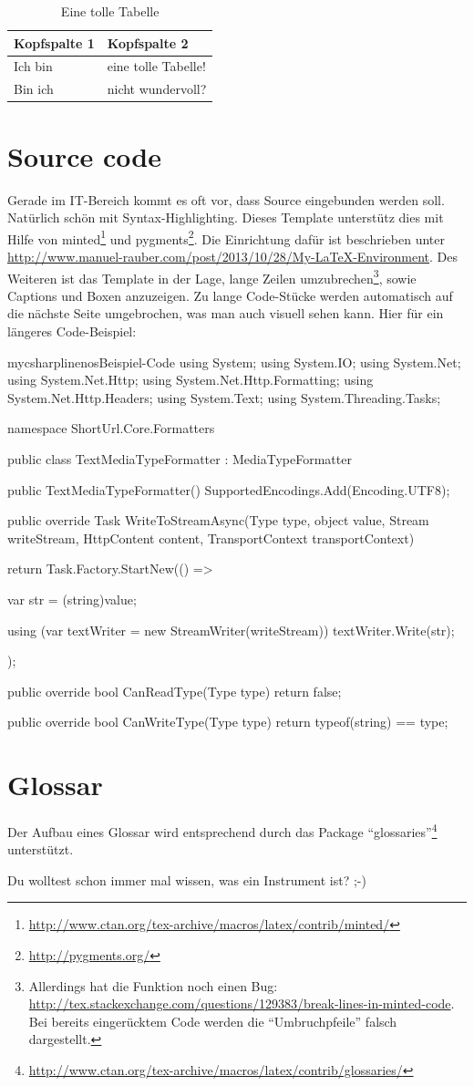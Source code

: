 \begin{table}[H]
\centering
\begin{tabular}{ll}
	\textbf{Kopfspalte 1} & \textbf{Kopfspalte 2} \\ \hline\hline
	Ich bin               & eine tolle Tabelle!   \\ \hline
	Bin ich               & nicht wundervoll?
\end{tabular}
\caption{Eine tolle Tabelle}
\end{table}

\section{Source code}

Gerade im IT-Bereich kommt es oft vor, dass Source eingebunden werden soll. Natürlich schön mit Syntax-Highlighting. 
Dieses Template unterstütz dies mit Hilfe von minted\footnote{\url{http://www.ctan.org/tex-archive/macros/latex/contrib/minted/}} und pygments\footnote{\url{http://pygments.org/}}. Die Einrichtung dafür ist beschrieben unter \url{http://www.manuel-rauber.com/post/2013/10/28/My-LaTeX-Environment}.
Des Weiteren ist das Template in der Lage, lange Zeilen umzubrechen\footnote{Allerdings hat die Funktion noch einen Bug: \url{http://tex.stackexchange.com/questions/129383/break-lines-in-minted-code}. Bei bereits eingerücktem Code werden die \enquote{Umbruchpfeile} falsch dargestellt.}, sowie Captions und Boxen anzuzeigen. Zu lange Code-Stücke werden automatisch auf die nächste Seite umgebrochen, was man auch visuell sehen kann. Hier für ein längeres Code-Beispiel:

\begin{listingsbox}{mycsharplinenos}{Beispiel-Code}
using System;
using System.IO;
using System.Net;
using System.Net.Http;
using System.Net.Http.Formatting;
using System.Net.Http.Headers;
using System.Text;
using System.Threading.Tasks;

namespace ShortUrl.Core.Formatters
{
	public class TextMediaTypeFormatter : MediaTypeFormatter
	{
		public TextMediaTypeFormatter()
		{
			SupportedEncodings.Add(Encoding.UTF8);
		}

		public override Task WriteToStreamAsync(Type type, object value, Stream writeStream, HttpContent content,
			TransportContext transportContext)
		{
			return Task.Factory.StartNew(() =>
			{

				var str = (string)value;

				using (var textWriter = new StreamWriter(writeStream))
				{
					textWriter.Write(str);
				}
			});
		}

		public override bool CanReadType(Type type)
		{
			return false;
		}

		public override bool CanWriteType(Type type)
		{
			return typeof(string) == type;
		}
	}
}
\end{listingsbox}

\section{Glossar}

Der Aufbau eines Glossar wird entsprechend durch das Package \enquote{glossaries}\footnote{\url{http://www.ctan.org/tex-archive/macros/latex/contrib/glossaries/}} unterstützt.

Du wolltest schon immer mal wissen, was ein \gls{Instrument} ist? ;-)
